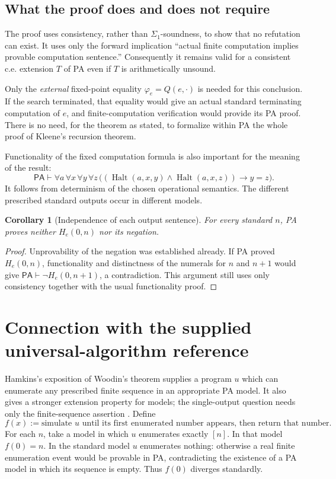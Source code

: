 \documentclass[11pt]{article}
\newcommand{\PA}{\mathsf{PA}}
\newcommand{\Halt}{\operatorname{Halt}}
\newtheorem{corollary}[theorem]{Corollary}
\theoremstyle{definition}
\theoremstyle{remark}
\begin{document}
\subsection{What the proof does and does not require}

The proof uses consistency, rather than $\Sigma_1$-soundness, to show that
no refutation can exist. It uses only the forward implication
``actual finite computation implies provable computation sentence.''
Consequently it remains valid for a consistent c.e. extension $T$ of PA
even if $T$ is arithmetically unsound.

Only the \emph{external} fixed-point equality
$\varphi_e=Q(e,\cdot)$ is needed for this conclusion. If the search
terminated, that equality would give an actual standard terminating
computation of $e$, and finite-computation verification would provide its
PA proof. There is no need, for the theorem as stated, to formalize within
PA the whole proof of Kleene's recursion theorem.

Functionality of the fixed computation formula is also important for the
meaning of the result:
\[
 \PA\vdash
 \forall a\,\forall x\,\forall y\,\forall z\,
 \bigl((\Halt(a,x,y)\land\Halt(a,x,z))\to y=z\bigr).
\]
It follows from determinism of the chosen operational semantics. The
different prescribed standard outputs occur in different models.

\begin{corollary}[Independence of each output sentence]
For every standard $n$, PA proves neither $H_e(0,n)$ nor its negation.
\end{corollary}
\begin{proof}
Unprovability of the negation was established already. If PA proved
$H_e(0,n)$, functionality and distinctness of the numerals for $n$ and
$n+1$ would give $\PA\vdash\neg H_e(0,n+1)$, a contradiction.
This argument still uses only consistency together with the usual
functionality proof.
\end{proof}

\section{Connection with the supplied universal-algorithm reference}

Hamkins's exposition of Woodin's theorem supplies a program $u$ which can
enumerate any prescribed finite sequence in an appropriate PA model. It
also gives a stronger extension property for models; the single-output
question needs only the finite-sequence assertion \cite{Hamkins2017}.
Define
\[
 f(x):=\text{simulate $u$ until its first enumerated number appears,
 then return that number}.
\]
For each $n$, take a model in which $u$ enumerates exactly $[n]$.
In that model $f(0)=n$. In the standard model $u$ enumerates nothing:
otherwise a real finite enumeration event would be provable in PA,
contradicting the existence of a PA model in which its sequence is empty.
Thus $f(0)$ diverges standardly.
\end{document}
